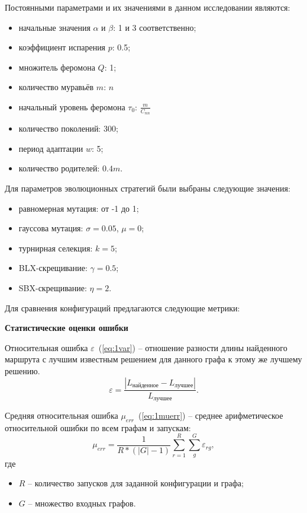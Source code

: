 Постоянными параметрами и их значениями в данном исследовании являются: 
\begin{itemize}
	\item начальные значения $\alpha$ и $\beta$: 1 и 3 соответственно;
	\item коэффициент испарения $p$: 0.5;
	\item множитель феромона $Q$: 1;
	\item количество муравьёв $m$: $n$
	\item начальный уровень феромона $\tau_0$: $\frac{m}{C_{nn}}$
	\item количество поколений: 300;
	\item период адаптации $w$: 5;
	\item количество родителей: $0.4m$.
\end{itemize}
Для параметров эволюционных стратегий были выбраны следующие значения:
\begin{itemize}
	\item равномерная мутация: от -1 до 1;
	\item гауссова мутация: $\sigma=0.05$, $\mu=0$;
	\item турнирная селекция: $k=5$;
	\item BLX-скрещивание: $\gamma=0.5$;
	\item SBX-скрещивание: $\eta=2$.
\end{itemize}

Для сравнения конфигураций предлагаются следующие метрики:

\textbf{Статистические оценки ошибки}

Относительная ошибка $\varepsilon$~(\ref{eq:1var}) -- отношение разности длины найденного маршрута с лучшим известным решением для данного графа к этому же лучшему решению.
\begin{equation}
	\varepsilon = \frac{|L_{\text{найденное}} - L_{\text{лучшее}}|}{L_{\text{лучшее}}}.
	\label{eq:1var}
\end{equation}

Средняя относительная ошибка $\mu_{err}$~(\ref{eq:1muerr}) -- среднее арифметическое относительной ошибки по всем графам и запускам:
\begin{equation}
\mu_{err} = \frac{1}{R*(|G|-1)} \sum_{r=1}^{R}\sum_{g}^{G} \varepsilon_{rg},
\label{eq:1muerr}
\end{equation}
где
\begin{itemize}
	\item $R$ -- количество запусков для заданной конфигурации и графа;
	\item $G$ -- множество входных графов.
\end{itemize}

